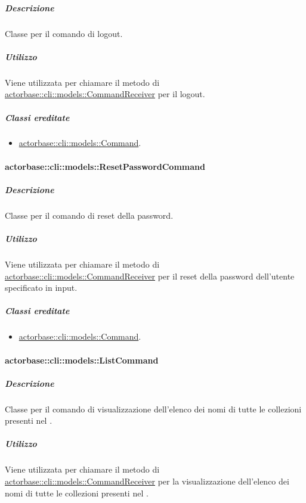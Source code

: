 \documentclass{scalatekids-article}
\begin{document}
\subparagraph{Descrizione}

Classe per il comando di logout.

\subparagraph{Utilizzo}

Viene utilizzata per chiamare il metodo di
\hyperref[sec:actorbase::cli::models::CommandReceiver]{actorbase::cli::models::CommandReceiver} per il logout.

\subparagraph{Classi ereditate}

\begin{itemize}
\item \hyperref[sec:actorbase::cli::models::Command]{actorbase::cli::models::Command}.
\end{itemize}

\paragraph{actorbase::cli::models::ResetPasswordCommand}
\label{sec:actorbase::cli::models::ResetPasswordCommand}

\subparagraph{Descrizione}

Classe per il comando di reset della password.

\subparagraph{Utilizzo}

Viene utilizzata per chiamare il metodo di
\hyperref[sec:actorbase::cli::models::CommandReceiver]{actorbase::cli::models::CommandReceiver} per il reset della password
dell'utente specificato in input.

\subparagraph{Classi ereditate}

\begin{itemize}
\item \hyperref[sec:actorbase::cli::models::Command]{actorbase::cli::models::Command}.
\end{itemize}

\paragraph{actorbase::cli::models::ListCommand}
\label{sec:actorbase::cli::models::ListCommand}

\subparagraph{Descrizione}

Classe per il comando di visualizzazione dell'elenco dei nomi di tutte le
collezioni presenti nel .

\subparagraph{Utilizzo}

Viene utilizzata per chiamare il metodo di
\hyperref[sec:actorbase::cli::models::CommandReceiver]{actorbase::cli::models::CommandReceiver} per la visualizzazione dell'elenco dei
nomi di tutte le collezioni presenti nel .
\end{document}
